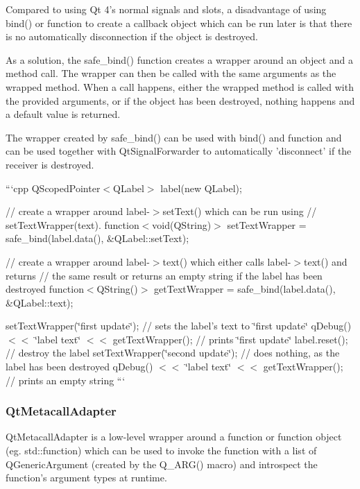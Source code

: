 Compared to using Qt 4's normal signals and slots, a disadvantage of using {\ttfamily bind()} or {\ttfamily function} to create a callback object which can be run later is that there is no automatically disconnection if the object is destroyed.

As a solution, the {\ttfamily safe\-\_\-bind()} function creates a wrapper around an object and a method call. The wrapper can then be called with the same arguments as the wrapped method. When a call happens, either the wrapped method is called with the provided arguments, or if the object has been destroyed, nothing happens and a default value is returned.

The wrapper created by {\ttfamily safe\-\_\-bind()} can be used with {\ttfamily bind()} and {\ttfamily function} and can be used together with {\ttfamily Qt\-Signal\-Forwarder} to automatically 'disconnect' if the receiver is destroyed.

```cpp Q\-Scoped\-Pointer$<$\-Q\-Label$>$ label(new Q\-Label);

// create a wrapper around label-\/$>$set\-Text() which can be run using // set\-Text\-Wrapper(text). function$<$void(\-Q\-String)$>$ set\-Text\-Wrapper = safe\-\_\-bind(label.\-data(), \&Q\-Label\-::set\-Text);

// create a wrapper around label-\/$>$text() which either calls label-\/$>$text() and returns // the same result or returns an empty string if the label has been destroyed function$<$\-Q\-String()$>$ get\-Text\-Wrapper = safe\-\_\-bind(label.\-data(), \&Q\-Label\-::text);

set\-Text\-Wrapper(\char`\"{}first update\char`\"{}); // sets the label's text to \char`\"{}first update\char`\"{} q\-Debug() $<$$<$ \char`\"{}label text\char`\"{} $<$$<$ get\-Text\-Wrapper(); // prints \char`\"{}first update\char`\"{} label.\-reset(); // destroy the label set\-Text\-Wrapper(\char`\"{}second update\char`\"{}); // does nothing, as the label has been destroyed q\-Debug() $<$$<$ \char`\"{}label text\char`\"{} $<$$<$ get\-Text\-Wrapper(); // prints an empty string ```

\subsubsection*{Qt\-Metacall\-Adapter}

Qt\-Metacall\-Adapter is a low-\/level wrapper around a function or function object (eg. {\ttfamily std\-::function}) which can be used to invoke the function with a list of Q\-Generic\-Argument (created by the Q\-\_\-\-A\-R\-G() macro) and introspect the function's argument types at runtime.

